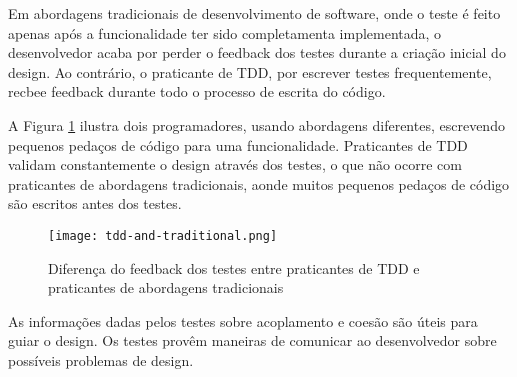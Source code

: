 Em abordagens tradicionais de desenvolvimento de software, onde o teste é feito
apenas após a funcionalidade ter sido completamenta implementada, o
desenvolvedor acaba por perder o feedback dos testes durante a criação inicial
do design. Ao contrário, o praticante de TDD, por escrever testes
frequentemente, recbee feedback durante todo o processo de escrita do código.

A Figura \ref{fig:tdd-feedback} ilustra dois programadores, usando
abordagens diferentes, escrevendo pequenos pedaços de código para uma
funcionalidade. Praticantes de TDD validam constantemente o design através dos
testes, o que não ocorre com praticantes de abordagens tradicionais, aonde
muitos pequenos pedaços de código são escritos antes dos testes.

\begin{figure}[H]
  \centering
  \texttt{[image: tdd-and-traditional.png]}
  \caption{Diferença do feedback dos testes entre praticantes de TDD e
  praticantes de abordagens tradicionais}
  \label{fig:tdd-feedback}
\end{figure}

As informações dadas pelos testes sobre acoplamento e coesão são úteis para
guiar o design. Os testes provêm maneiras de comunicar ao desenvolvedor sobre
possíveis problemas de design. 
